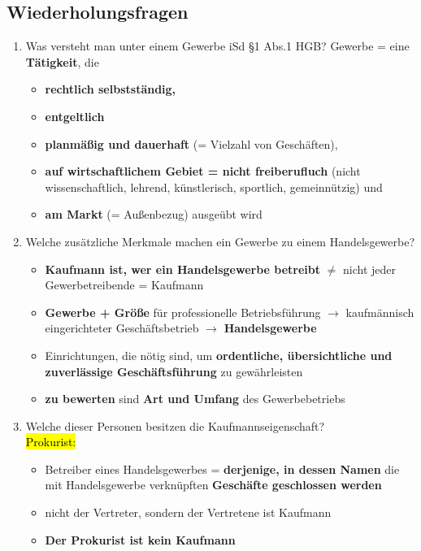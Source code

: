 \documentclass[a4paper, 10pt]{article}
\begin{document}
\subsection{Wiederholungsfragen}
\begin{enumerate}
    \item Was versteht man unter einem Gewerbe iSd §1 Abs.1 HGB?
        Gewerbe = eine \textbf{Tätigkeit}, die 
        \begin{itemize}
            \item \textbf{rechtlich selbstständig,}
            \item \textbf{entgeltlich}
            \item \textbf{planmäßig und dauerhaft} (= Vielzahl von Geschäften),
            \item \textbf{auf wirtschaftlichem Gebiet = nicht freiberufluch} (nicht wissenschaftlich, lehrend, künstlerisch, sportlich, gemeinnützig) und 
            \item \textbf{am Markt} (= Außenbezug) ausgeübt wird
        \end{itemize}

        \item Welche zusätzliche Merkmale machen ein Gewerbe zu einem Handelsgewerbe?
        \begin{itemize}
            \item \textbf{Kaufmann ist, wer ein Handelsgewerbe betreibt} $\neq$ nicht jeder Gewerbetreibende = Kaufmann 
            \item \textbf{Gewerbe + Größe} für professionelle Betriebsführung $\longrightarrow$ kaufmännisch eingerichteter Geschäftsbetrieb $\longrightarrow$ \textbf{Handelsgewerbe}
            \item Einrichtungen, die nötig sind, um \textbf{ordentliche, übersichtliche und zuverlässige Geschäftsführung} zu gewährleisten
            \item \textbf{zu bewerten} sind \textbf{Art und Umfang} des Gewerbebetriebs
        \end{itemize}

        \item Welche dieser Personen besitzen die Kaufmannseigenschaft?\\[2.5mm]
        \hl{Prokurist:}
        \begin{itemize}
            \item Betreiber eines Handelsgewerbes = \textbf{derjenige, in dessen Namen} die mit Handelsgewerbe verknüpften \textbf{Geschäfte geschlossen werden}
            \item nicht der Vertreter, sondern der Vertretene ist Kaufmann
            \item \textbf{Der Prokurist ist kein Kaufmann}
        \end{itemize}


\end{enumerate}
\end{document}
